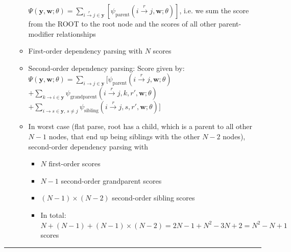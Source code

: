 \begin{itemize}
\begin{itemize}
        $\Psi(\boldsymbol{y}, \boldsymbol{w}; \theta) =
        \sum_{i \xrightarrow{r} j \in \boldsymbol{y}} \left[ \psi_{\text{parent}}(i \xrightarrow{r} j, \boldsymbol{w}; \theta) \right]
        $, i.e. we sum the score from the ROOT to the root node and the scores of all other parent-modifier relationships 
        \item First-order dependency parsing with $N$ scores
        \item Second-order dependency parsing: Score given by: $\Psi(\boldsymbol{y}, \boldsymbol{w}; \theta) =
        \sum_{i \to j \in \boldsymbol{y}} [ \psi_{\text{parent}}(i \xrightarrow{r} j, \boldsymbol{w}; \theta)$
        $+ \sum_{k \to i \in \boldsymbol{y}} \psi_{\text{grandparent}}(i \xrightarrow{r} j, k, r', \boldsymbol{w}; \theta)$
        $+ \sum_{i \to s \in \boldsymbol{y}, \, s \neq j} \psi_{\text{sibling}}(i \xrightarrow{r} j, s, r', \boldsymbol{w}; \theta) ]
        $
        \item In worst case (flat parse, root has a child, which is a parent to all other $N-1$ nodes, that end up being siblings with the other $N-2$ nodes), second-order dependency parsing with 
        \begin{itemize}
            \item $N$ first-order scores
            \item $N-1$ second-order grandparent scores
            \item $(N-1) \times (N-2)$ second-order sibling scores
            \item In total: $N + (N-1) + (N-1) \times (N-2) = 2N - 1 + N^2 -3N + 2 = N^2 - N + 1$ scores
        \end{itemize} 
    \end{itemize}
\end{itemize}

{\color{lightgray}\hrule height 0.001mm}

